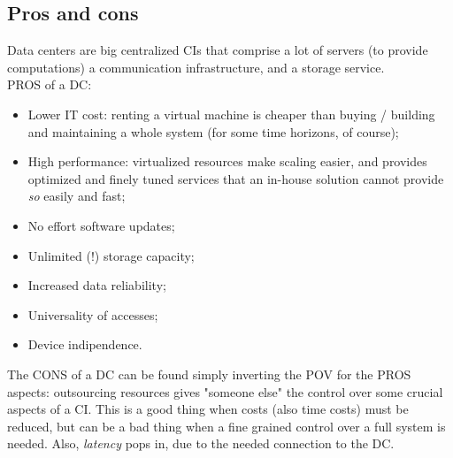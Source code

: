 \documentclass[10pt,a4paper]{article}
\begin{document}
			\subsection{Pros and cons}
				Data centers are big centralized CIs that comprise a lot of servers (to provide computations) a communication infrastructure, and a storage service.\\ 
				PROS of a DC:
				\begin{itemize}
					\item Lower IT cost: renting a virtual machine is cheaper than buying / building and maintaining a whole system (for some time horizons, of course);
					\item High performance: virtualized resources make scaling easier, and provides optimized and finely tuned services that an in-house solution cannot provide \emph{so} easily and fast;
					\item No effort software updates;
					\item Unlimited (!) storage capacity;
					\item Increased data reliability;
					\item Universality of accesses;
					\item Device indipendence.
				\end{itemize}
				The CONS of a DC can be found simply inverting the POV for the PROS aspects: outsourcing resources gives "someone else" the control over some crucial aspects of a CI. This is a good thing when costs (also time costs) must be reduced, but can be a bad thing when a fine grained control over a full system is needed. Also, \emph{latency} pops in, due to the needed connection to the DC.
				
\end{document}
